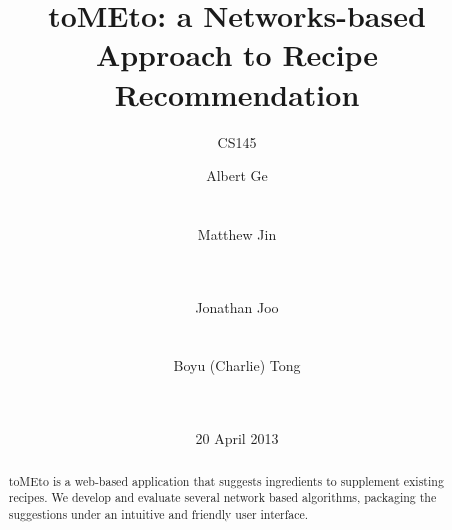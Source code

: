 \documentclass{acm_proc_article-sp}
\begin{document}
\title{toMEto: a Networks-based Approach to Recipe Recommendation}
\subtitle{CS145}


\makeatletter
\def\BState{\State\hskip-\ALG@thistlm}
\makeatother


\author{
\alignauthor
Albert Ge\\
       \\
       \\
\alignauthor
Matthew Jin\\
       \\
       \\
\and %
\alignauthor
Jonathan Joo\\
       \\
       \\
\alignauthor
Boyu (Charlie) Tong\\
       \\
       \\
}

\date{20 April 2013}


\maketitle
\begin{abstract}
toMEto is a web-based application that suggests ingredients to supplement existing recipes. We develop and evaluate several network based algorithms, packaging the suggestions under an intuitive and friendly user interface. 
\end{abstract}



\end{document}
